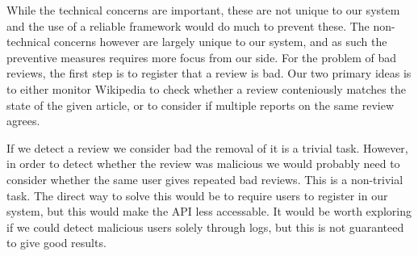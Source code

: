 While the technical concerns are important, these are not unique to our system and the use of a reliable framework would do much to prevent these. The non-technical concerns however are largely unique to our system, and as such the preventive measures requires more focus from our side. For the problem of bad reviews, the first step is to register that a review is bad. Our two primary ideas is to either monitor Wikipedia to check whether a review conteniously matches the state of the given article, or to consider if multiple reports on the same review agrees.

If we detect a review we consider bad the removal of it is a trivial task. However, in order to detect whether the review was malicious we would probably need to consider whether the same user gives repeated bad reviews. This is a non-trivial task. The direct way to solve this would be to require users to register in our system, but this would make the API less accessable. It would be worth exploring if we could detect malicious users solely through logs, but this is not guaranteed to give good results.